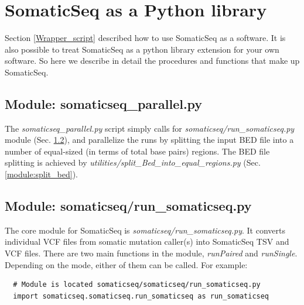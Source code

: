 \documentclass[10pt,letterpaper]{article}
\begin{document}
\begin{sloppypar}
\section{SomaticSeq as a Python library} \label{somaticseq_package}


Section \ref{Wrapper_script} described how to use SomaticSeq as a software. It is also possible to treat SomaticSeq as a python library extension for your own software. So here we describe in detail the procedures and functions that make up SomaticSeq. 
 

\subsection{Module: somaticseq\_parallel.py} \label{module:somaticseq_parallel}

The \emph{somaticseq\_parallel.py} script simply calls for \emph{somaticseq/run\_somaticseq.py} module (Sec. \ref{module:run_somaticseq}), and parallelize the runs by splitting the input BED file into a number of equal-sized (in terms of total base pairs) regions. The BED file splitting is achieved by \emph{utilities/split\_Bed\_into\_equal\_regions.py} (Sec. \ref{module:split_bed}).


\subsection{Module: somaticseq/run\_somaticseq.py} \label{module:run_somaticseq}

The core module for SomaticSeq is \emph{somaticseq/run\_somaticseq.py}. It converts individual VCF files from somatic mutation caller(s) into SomaticSeq TSV and VCF files. There are two main functions in the module, \emph{runPaired} and \emph{runSingle}. Depending on the mode, either of them can be called. For example:

\begin{lstlisting}
  # Module is located somaticseq/somaticseq/run_somaticseq.py
  import somaticseq.somaticseq.run_somaticseq as run_somaticseq
  

\end{lstlisting}
\end{sloppypar}
\end{document}
